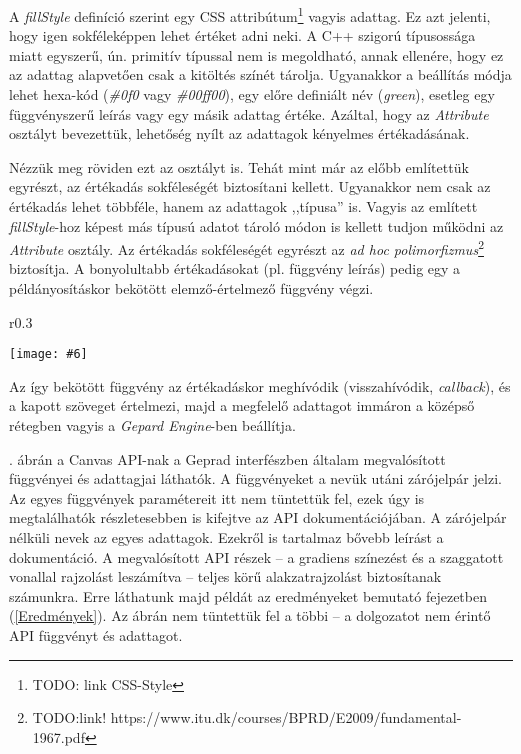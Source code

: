 \documentclass[12pt]{report}
\makeatletter
\theoremstyle{definition}
\newcommand{\inenglish}[1]{\textsl{#1}}
\newcommand{\func}[1]{{\textsl{#1}}}
\newcommand{\melyikoldalra}{r}
\newlength{\Xoffset}
\newlength{\Yoffset}
\newcommand*{\setpdfoffset}[2]{%
  \setlength{\Xoffset}{#1}%
  \setlength{\Yoffset}{#2}%
}
\newcommand*{\setviewport}[4]{%
  \def\x@viewport{%
    {\the\dimexpr#1-\Xoffset}
    {\the\dimexpr#2-\Yoffset}
    {\the\dimexpr#3-\Xoffset}
    {\the\dimexpr#4-\Yoffset}%
  }%
}
\newcommand{\includegraphicskivagas}[6]{
    \setpdfoffset{0pt}{0pt}
    \setviewport{#1}{#2}{#3}{#4}
    \texttt{[image: \#6]}
}
\newcommand{\includedataflowkivagas}[5]{
    \includegraphicskivagas{#1}{#2}{#3}{#4}{scale=0.6,#5}
    {img/built/dataflow_eps}
}
\makeatother
\begin{document}
A \func{fillStyle} definíció szerint egy CSS attribútum\footnote{TODO: link
CSS-Style} vagyis adattag. Ez azt jelenti, hogy igen sokféleképpen lehet
értéket adni neki. A C++ szigorú típusossága miatt egyszerű, ún. primitív
típussal nem is megoldható, annak ellenére, hogy ez az adattag alapvetően csak
a kitöltés színét tárolja. Ugyanakkor a beállítás módja lehet hexa-kód
(\func{\#0f0} vagy \func{\#00ff00}), egy előre definiált név (\func{green}),
esetleg egy függvényszerű leírás vagy egy másik adattag értéke. Azáltal, hogy
az \func{Attribute} osztályt bevezettük, lehetőség nyílt az adattagok kényelmes
értékadásának.

Nézzük meg röviden ezt az osztályt is. Tehát mint már az előbb említettük
egyrészt, az értékadás sokféleségét biztosítani kellett. Ugyanakkor nem csak az
értékadás lehet többféle, hanem az adattagok ,,típusa'' is. Vagyis az említett
\func{fillStyle}-hoz képest más típusú adatot tároló módon is kellett tudjon
működni az \func{Attribute} osztály. Az értékadás sokféleségét egyrészt az
\emph{ad hoc polimorfizmus}\footnote{TODO:link!
https://www.itu.dk/courses/BPRD/E2009/fundamental-1967.pdf} biztosítja. A
bonyolultabb értékadásokat (pl. függvény leírás) pedig egy a példányosításkor
bekötött elemző-értelmező függvény végzi.
  \begin{wrapfigure}{\melyikoldalra}{0.3\textwidth}
    \begin{center}
      \includedataflowkivagas{0pt}{210pt}{160pt}{590pt}{}
    \end{center}
    \caption{\label{dataflow-API-diagram} A \emph{felső} réteg, vagyis
    a Gepard interfész függvényei és adattagjai}
  \end{wrapfigure}
Az így bekötött függvény az értékadáskor meghívódik (visszahívódik,
\inenglish{callback}), és a kapott szöveget értelmezi, majd a megfelelő
adattagot immáron a középső rétegben vagyis a \func{Gepard Engine}-ben
beállítja.

. ábrán a Canvas API-nak a Geprad interfészben
általam megvalósított függvényei és adattagjai láthatók. A függvényeket a nevük
utáni zárójelpár jelzi. Az egyes függvények paramétereit itt nem tüntettük fel,
ezek úgy is megtalálhatók részletesebben is kifejtve az API dokumentációjában.
A zárójelpár nélküli nevek az egyes adattagok. Ezekről is tartalmaz bővebb
leírást a dokumentáció. A megvalósított API részek -- a gradiens színezést és a
szaggatott vonallal rajzolást leszámítva -- teljes körű alakzatrajzolást
biztosítanak számunkra. Erre láthatunk majd példát az eredményeket bemutató
fejezetben (\ref{Eredmények}). Az ábrán nem tüntettük fel a többi -- a
dolgozatot nem érintő API függvényt és adattagot.
\end{document}
